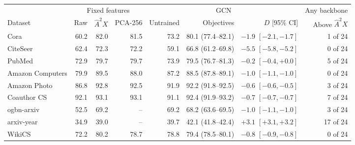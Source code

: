 \begin{tabular}{@{}lrrrrrrr@{}}
\toprule
 & \multicolumn{3}{c}{Fixed features} & \multicolumn{3}{c}{GCN} & Any backbone \\
\cmidrule(lr){2-4}\cmidrule(lr){5-7}\cmidrule(l){8-8}
Dataset & Raw & $\hat A^2X$ & PCA-256 & Untrained & Objectives & $D$ [95\% CI] & Above $\hat A^2X$ \\
\midrule
Cora & 60.2 & 82.0 & 81.5 & 73.2 & 80.1 (77.4--82.1) & $-1.9$ $[-2.1, -1.7]$ & 1 of 24 \\
CiteSeer & 62.4 & 72.3 & 72.2 & 59.1 & 66.8 (61.2--69.8) & $-5.5$ $[-5.8, -5.2]$ & 0 of 24 \\
PubMed & 72.9 & 79.7 & 79.7 & 73.9 & 79.5 (76.7--81.3) & $-0.2$ $[-0.4, +0.0]$ & 5 of 24 \\
Amazon Computers & 79.9 & 89.5 & 88.0 & 87.2 & 88.5 (87.8--89.1) & $-1.0$ $[-1.1, -1.0]$ & 0 of 24 \\
Amazon Photo & 86.8 & 92.8 & 92.5 & 91.9 & 92.2 (91.8--92.5) & $-0.6$ $[-0.6, -0.5]$ & 3 of 24 \\
Coauthor CS & 92.1 & 93.1 & 93.1 & 91.1 & 92.4 (91.9--93.2) & $-0.7$ $[-0.7, -0.7]$ & 7 of 24 \\
ogbn-arxiv & 52.5 & 69.2 & -- & 69.2 & 68.2 (63.6--69.5) & $-1.0$ $[-1.1, -1.0]$ & 3 of 24 \\
arxiv-year & 34.9 & 39.0 & -- & 39.7 & 42.1 (41.8--42.4) & $+3.1$ $[+3.1, +3.2]$ & 17 of 24 \\
\midrule
WikiCS & 72.2 & 80.2 & 78.7 & 78.8 & 79.4 (78.5--80.1) & $-0.8$ $[-0.9, -0.8]$ & 0 of 24 \\
\bottomrule
\end{tabular}
